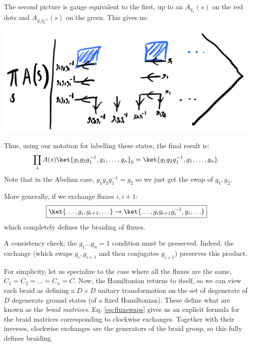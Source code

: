 The second picture is gauge equivalent to the first, up to an $A_{g_1}(s)$ on the red dots and $A_{g_1g_2^{-1}}(s)$ on the green. This gives us:

\begin{center}
    \includegraphics[scale=0.35]{Lectures/Images/lec10-swappedstate.png}
\end{center}

Thus, using our notation for labelling these states, the final result is:
\begin{equation}
    \prod_s A(s)\ket{g_1g_2g_1^{-1}, g_1, \ldots, g_n}_0 = \ket{g_1g_2g_1^{-1}, g_1, \ldots, g_n}.
\end{equation}
Note that in the Abelian case, $g_1g_2g_1^{-1} = g_2$ so we just get the swap of $g_1, g_2$.

More generally, if we exchange fluxes $i, i+1$:
\begin{equation}\label{eq:fluxswaps}
    \boxed{\ket{\ldots, g_i, g_{i+1}, \ldots} \to \ket{\ldots, g_i g_{i+1}g_i^{-1}, g_i, \ldots}}
\end{equation}
which completely defines the braiding of fluxes.

A consistency check; the $g_1\ldots g_n = 1$ condition must be preserved. Indeed, the exchange (which swaps $g_i, g_{i+1}$ and then conjugates $g_{i+1}$) preserves this product.

For simplicity, let us specialize to the case where all the fluxes are the same, $C_1 = C_2 = \ldots = C_n = C$. Now, the Hamiltonian returns to itself, so we can view each braid as defining a $D \times D$ unitary transformation on the set of degenerate of $D$ degenerate ground states (of a fixed Hamiltonian). These define what are known as the \emph{braid matrices}. Eq. \eqref{eq:fluxswaps} gives us an explicit formula for the braid matrices corresponding to clockwise exchanges. Together with their inverses, clockwise exchanges are the generators of the braid group, so this fully defines braiding.

